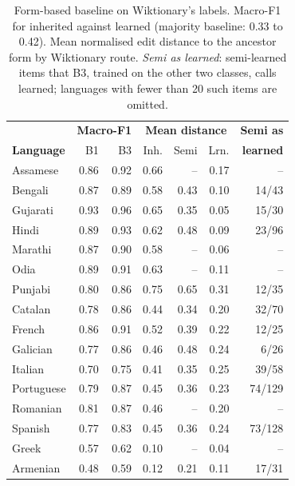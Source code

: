 \documentclass[11pt]{article}
\begin{document}
\begin{table}[t]
\centering\small
\setlength{\tabcolsep}{3.5pt}
\begin{tabular}{lrrrrrr}
\toprule
& \multicolumn{2}{c}{\textbf{Macro-F1}} & \multicolumn{3}{c}{\textbf{Mean distance}} & \textbf{Semi as} \\
\textbf{Language} & B1 & B3 & Inh. & Semi & Lrn. & \textbf{learned} \\
\midrule
Assamese & 0.86 & 0.92 & 0.66 & -- & 0.17 & -- \\
Bengali & 0.87 & 0.89 & 0.58 & 0.43 & 0.10 & 14/43 \\
Gujarati & 0.93 & 0.96 & 0.65 & 0.35 & 0.05 & 15/30 \\
Hindi & 0.89 & 0.93 & 0.62 & 0.48 & 0.09 & 23/96 \\
Marathi & 0.87 & 0.90 & 0.58 & -- & 0.06 & -- \\
Odia & 0.89 & 0.91 & 0.63 & -- & 0.11 & -- \\
Punjabi & 0.80 & 0.86 & 0.75 & 0.65 & 0.31 & 12/35 \\
\midrule
Catalan & 0.78 & 0.86 & 0.44 & 0.34 & 0.20 & 32/70 \\
French & 0.86 & 0.91 & 0.52 & 0.39 & 0.22 & 12/25 \\
Galician & 0.77 & 0.86 & 0.46 & 0.48 & 0.24 & 6/26 \\
Italian & 0.70 & 0.75 & 0.41 & 0.35 & 0.25 & 39/58 \\
Portuguese & 0.79 & 0.87 & 0.45 & 0.36 & 0.23 & 74/129 \\
Romanian & 0.81 & 0.87 & 0.46 & -- & 0.20 & -- \\
Spanish & 0.77 & 0.83 & 0.45 & 0.36 & 0.24 & 73/128 \\
\midrule
Greek & 0.57 & 0.62 & 0.10 & -- & 0.04 & -- \\
\midrule
Armenian & 0.48 & 0.59 & 0.12 & 0.21 & 0.11 & 17/31 \\
\bottomrule
\end{tabular}
\caption{Form-based baseline on Wiktionary's labels. Macro-F1 for inherited against learned (majority baseline: 0.33 to 0.42). Mean normalised edit distance to the ancestor form by Wiktionary route. \textit{Semi as learned}: semi-learned items that B3, trained on the other two classes, calls learned; languages with fewer than 20 such items are omitted.}
\label{tab:baseline}
\end{table}
\end{document}
